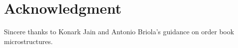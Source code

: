 \section{Acknowledgment}
Sincere thanks to Konark Jain and Antonio Briola's guidance on order book microstructures. 